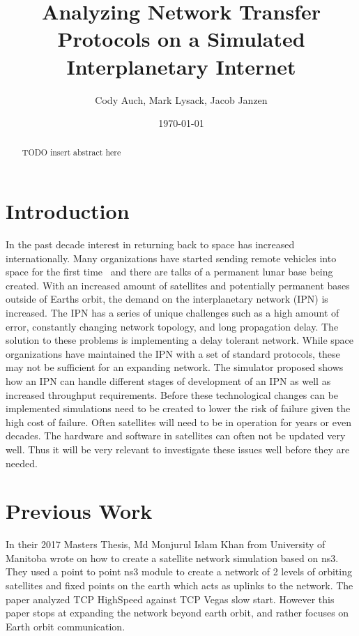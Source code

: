 \documentclass[a4paper,12pt]{article}
\title{Analyzing Network Transfer Protocols on a Simulated Interplanetary Internet}
\author{Cody Auch, Mark Lysack, Jacob Janzen}
\date{\today}
\begin{document}
\maketitle

\begin{abstract}
    TODO insert abstract here
\end{abstract}

\section{Introduction}

In the past decade interest in returning back to space has increased
internationally. Many organizations have started sending remote vehicles into
space for the first time~%
and there
are talks of a permanent lunar base being created. With an increased amount of
satellites and potentially permanent bases outside of Earths orbit, the demand
on the interplanetary network (IPN) is increased. The IPN has a series of unique
challenges such as a high amount of error, constantly changing network topology,
and long propagation delay. The solution to these problems is implementing a
delay tolerant network. While space organizations have maintained the IPN with a
set of standard protocols, these may not be sufficient for an expanding network.
The simulator proposed shows how an IPN can handle different stages of
development of an IPN as well as increased throughput requirements.
Before these technological changes can be implemented simulations need to be created to 
lower the risk of failure given the high cost of failure. Often satellites will need to be in operation for years 
or even decades. The hardware and software in satellites can often not be updated very well. Thus it will be very 
relevant to investigate these issues well before they are needed. 


\section{Previous Work}

In their 2017 Masters Thesis, Md Monjurul Islam Khan \cite{Khan2017} from University of Manitoba wrote on how 
to create a satellite network
simulation based on ns3. They used a point to point ns3 module to create a network of 2 levels of orbiting 
satellites and fixed points on the earth which acts as uplinks to the network. The paper analyzed TCP 
HighSpeed against TCP Vegas slow start. However this paper stops at expanding the network beyond earth orbit, 
and rather focuses on Earth orbit communication.  
\end{document}
